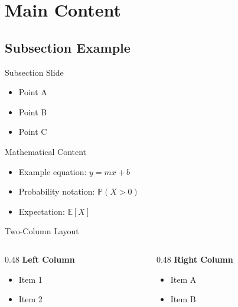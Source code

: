 \documentclass[aspectratio=169, dvipsnames, handout]{beamer}
\newcommand{\pr}{\mathbb{P}}	%
\newcommand{\E}{\mathbb{E}}	%
\newcommand{\1}{\mathds{1}}	%
\begin{document}
\section{Main Content}

\subsection{Subsection Example}

\begin{frame}{Subsection Slide}
    \begin{itemize}
        \item Point A
        \item Point B
        \item Point C
    \end{itemize}
\end{frame}

\begin{frame}{Mathematical Content}
    \begin{itemize}
        \item Example equation: $y = mx + b$
        \item Probability notation: $\pr(X > 0)$
        \item Expectation: $\E[X]$
    \end{itemize}
\end{frame}

\begin{frame}{Two-Column Layout}
    \begin{columns}
        \begin{column}{0.48\textwidth}
            \textbf{Left Column}
            \begin{itemize}
                \item Item 1
                \item Item 2
            \end{itemize}
        \end{column}
        \begin{column}{0.48\textwidth}
            \textbf{Right Column}
            \begin{itemize}
                \item Item A
                \item Item B
            \end{itemize}
        \end{column}
    \end{columns}
\end{frame}
\end{document}

